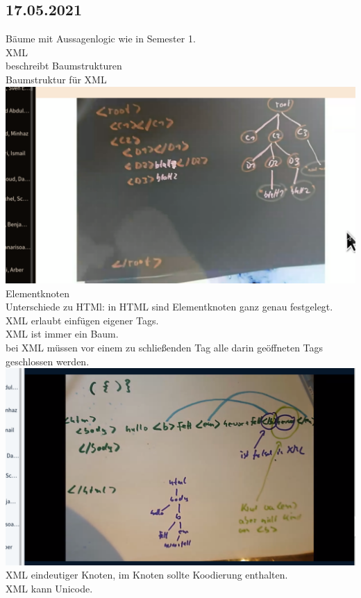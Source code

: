 \documentclass[paper=A4]{article}
\begin{document}
	\subsection*{17.05.2021}
	Bäume mit Aussagenlogic wie in Semester 1. \\
	XML \\
	beschreibt Baumstrukturen \\
	Baumstruktur für XML \\
	\includegraphics[width=\linewidth]{picbaum}
	Elementknoten \\
	Unterschiede zu HTMl: in HTML sind Elementknoten ganz genau festgelegt. \\
	XML erlaubt einfügen eigener Tags. \\
	XML ist immer ein Baum. \\
	bei XML müssen vor einem zu schließenden Tag alle darin geöffneten Tags geschlossen werden. \\
	\includegraphics[width=\linewidth]{picbaum2} \\
	XML eindeutiger Knoten, im Knoten sollte Koodierung enthalten. \\
	XML kann Unicode. \\
\end{document}
